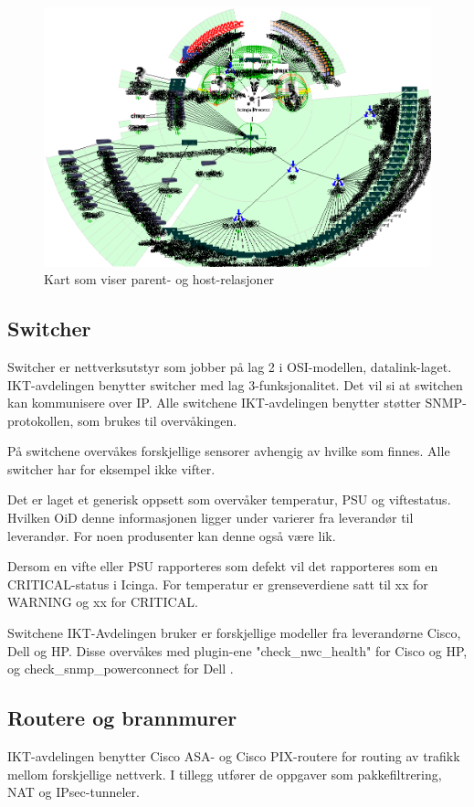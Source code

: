 \begin{figure}[H]
    \centering
    \includegraphics[scale=0.6]{img/statusmap}
    \caption{Kart som viser parent- og host-relasjoner}
    \label{statusmap}
\end{figure}

\subsection{Switcher}\label{sec:switch}
Switcher er nettverksutstyr som jobber på lag 2 i OSI-modellen, datalink-laget. IKT-avdelingen benytter switcher med lag 3-funksjonalitet. Det vil si at switchen kan kommunisere over IP. Alle switchene IKT-avdelingen benytter støtter SNMP-protokollen, som brukes til overvåkingen.

På switchene overvåkes forskjellige sensorer avhengig av hvilke som finnes. Alle switcher har for eksempel ikke vifter.

Det er laget et generisk oppsett som overvåker temperatur, PSU og viftestatus. Hvilken OiD denne informasjonen ligger under varierer fra leverandør til leverandør. For noen produsenter kan denne også være lik. 

Dersom en vifte eller PSU rapporteres som defekt vil det rapporteres som en CRITICAL-status i Icinga. For temperatur er grenseverdiene satt til xx for WARNING og xx for CRITICAL.

Switchene IKT-Avdelingen bruker er forskjellige modeller fra leverandørne Cisco, Dell og HP. Disse overvåkes med plugin-ene "check\_nwc\_health" \cite{checknwc} for Cisco og HP, og check\_snmp\_powerconnect for Dell \cite{checkpowerconnect}.

\subsection{Routere og brannmurer}
IKT-avdelingen benytter Cisco ASA- og Cisco PIX-routere for routing av trafikk mellom forskjellige nettverk. I tillegg utfører de oppgaver som pakkefiltrering, NAT og IPsec-tunneler.

